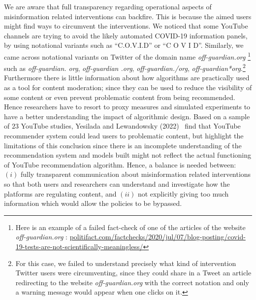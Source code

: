 \documentclass{article}
\begin{document}
We are aware that full transparency regarding operational aspects of misinformation related interventions can backfire.
This is because the aimed users might find ways to circumvent the interventions. 
We noticed that some YouTube channels are trying to avoid the likely automated COVID-19 information panels, by using notational variants such as ``C.O.V.I.D'' or ``C O V I D''. 
Similarly, we came across notational variants on Twitter of the domain name {\it off-guardian.org}
\footnote{Here is an example of a failed fact-check of one of the articles of the website {\it off-guardian.org} : \href{https://www.politifact.com/factchecks/2020/jul/07/blog-posting/covid-19-tests-are-not-scientifically-meaningless/}{politifact.com/factchecks/2020/jul/07/blog-posting/covid-19-tests-are-not-scientifically-meaningless/}}
such as {\it off-guardian. org}, {\it off-guardian .org}, {\it off-guardian./org}, {\it off-guardian*org}.\footnote{For this case, we failed to understand precisely what kind of intervention Twitter users were circumventing, since they could share in a Tweet an article redirecting to the website {\it off-guardian.org} with the correct notation and only a warning message would appear when one clicks on it.} Furthermore there is little information about how algorithms are practically used as a tool for content moderation; since they can be used to reduce the visibility of some content or even prevent problematic content from being recommended.  Hence researchers have to resort to proxy measures and simulated experiments to have a better understanding the impact of algorithmic design. Based on a sample of $23$ YouTube studies, Yesilada and Lewandowsky (2022)~\cite{yesilada} find that YouTube recommender system could lead users to problematic content, but highlight the limitations of this conclusion since there is an incomplete understanding of the recommendation system and models built might not reflect the actual functioning of YouTube recommendation algorithm. 
Hence, a balance is needed between: $(i)$ fully transparent communication about misinformation related interventions so that both users and researchers can understand and investigate how the platforms are regulating content, and $(ii)$ not explicitly giving too much information which would allow the policies to be bypassed.

\smallskip
\end{document}
